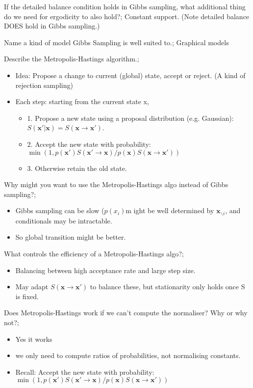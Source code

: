 \documentclass{article}
\begin{document}
If the detailed balance condition holds in Gibbs sampling, what additional thing do we need for ergodicity to also hold?; Constant support. (Note detailed balance DOES hold in Gibbs sampling.)

Name a kind of model Gibbs Sampling is well suited to.; Graphical models

Describe the Metropolis-Hastings algorithm.; \begin{itemize}
    \item Idea: Propose a change to current (global) state, accept or reject. (A kind of rejection sampling)
    \item Each step: starting from the current state x, \begin{itemize}
        \item 1. Propose a new state  using a proposal distribution (e.g. Gaussian): $S(\mathbf{x'|x}) = S(\mathbf{x\rightarrow x'})$.
        \item 2. Accept the new state with probability: $\min (1, p(\mathbf{x'})S(\mathbf{x'\rightarrow x})/p(\mathbf{x})S(\mathbf{x}\rightarrow \mathbf{x'}))$
        \item 3. Otherwise retain the old state.
    \end{itemize}
\end{itemize}

Why might you want to use the Metropolis-Hastings algo instead of Gibbs sampling?; \begin{itemize}
    \item Gibbs sampling can be slow ($p(x_i)$m ight be well determined by $\mathbf{x}_{\backslash i}$, and conditionals may be intractable.
    \item So global transition might be better.
\end{itemize}

What controls the efficiency of a Metropolis-Hastings algo?; \begin{itemize}
    \item Balancing between high acceptance rate and large step size.
    \item May adapt $S(\mathbf{x\rightarrow x'})$ to balance these, but stationarity only holds once S is fixed.
\end{itemize}

Does Metropolis-Hastings work if we can't compute the normaliser? Why or why not?; \begin{itemize}
    \item Yes it works
    \item we only need to compute ratios of probabilities, not normalising constants.
        \item Recall: Accept the new state with probability: $\min (1, p(\mathbf{x'})S(\mathbf{x'\rightarrow x})/p(\mathbf{x})S(\mathbf{x}\rightarrow \mathbf{x'}))$
\end{itemize}
\end{document}
